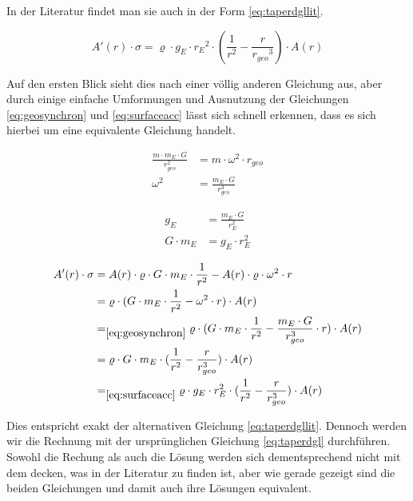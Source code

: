 \documentclass[a4paper, 10pt]{report}
\begin{document}
In der Literatur\cite{PE75} findet man sie auch in der Form \ref{eq:taperdgllit}.

\begin{equation}
A'(r) \cdot \sigma = \varrho \cdot g_E \cdot {r_E}^2 \cdot (\frac{1}{r^2} - \frac{r}{{r_{geo}}^3}) \cdot A(r)
\label{eq:taperdgllit}
\end{equation}

Auf den ersten Blick sieht dies nach einer völlig anderen Gleichung aus, aber durch einige einfache Umformungen und Ausnutzung der Gleichungen \ref{eq:geosynchron} und \ref{eq:surfaceacc} lässt sich schnell erkennen, dass es sich hierbei um eine equivalente Gleichung handelt.

\begin{align}
\frac{m \cdot m_E \cdot G}{r_{geo}^2} &= m \cdot \omega^2 \cdot r_{geo}\nonumber \\
\omega^2 &= \frac{m_E \cdot G}{r_{geo}^3}
\label{eq:geosynchron}
\end{align}

\begin{align}
g_E &= \frac{m_E \cdot G}{r_E^2} \nonumber \\
G \cdot m_E &= g_E \cdot r_E^2
\label{eq:surfaceacc}
\end{align}

\begin{align*}
A'(r) \cdot \sigma &= A(r) \cdot \varrho \cdot G \cdot m_E \cdot \frac{1}{r^2} - A(r) \cdot \varrho \cdot \omega^2 \cdot r\\
&= \varrho \cdot (G \cdot m_E \cdot \frac{1}{r^2} - \omega^2 \cdot r) \cdot A(r)\\
&=_{\ref{eq:geosynchron}} \varrho \cdot (G \cdot m_E \cdot \frac{1}{r^2} - \frac{m_E \cdot G}{r_{geo}^3} \cdot r) \cdot A(r)\\
&= \varrho \cdot G \cdot m_E \cdot (\frac{1}{r^2} - \frac{r}{r_{geo}^3}) \cdot A(r)\\
&=_{\ref{eq:surfaceacc}} \varrho \cdot g_E \cdot r_E^2 \cdot (\frac{1}{r^2} - \frac{r}{r_{geo}^3}) \cdot A(r)\\
\end{align*}

Dies entspricht exakt der alternativen Gleichung \ref{eq:taperdgllit}. Dennoch werden wir die Rechnung mit der ursprünglichen Gleichung \ref{eq:taperdgl} durchführen. Sowohl die Rechung als auch die Lösung werden sich dementsprechend nicht mit dem decken, was in der Literatur zu finden ist, aber wie gerade gezeigt sind die beiden Gleichungen und damit auch ihre Lösungen equivalent.
\end{document}

